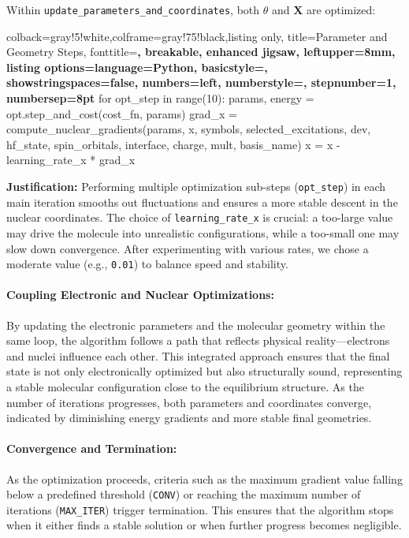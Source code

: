 Within \texttt{update\_parameters\_and\_coordinates}, both \(\theta\) and \(\mathbf{X}\) are optimized:
\begin{tcblisting}{colback=gray!5!white,colframe=gray!75!black,listing only,
    title=Parameter and Geometry Steps, fonttitle=\bfseries, breakable, enhanced jigsaw, leftupper=8mm,
    listing options={language=Python, basicstyle=\ttfamily\small,
    showstringspaces=false, numbers=left, numberstyle=\footnotesize, stepnumber=1, numbersep=8pt}}
for opt_step in range(10):
    params, energy = opt.step_and_cost(cost_fn, params)
    grad_x = compute_nuclear_gradients(params, x, symbols, selected_excitations, 
                                       dev, hf_state, spin_orbitals, interface, charge, mult, basis_name)
    x = x - learning_rate_x * grad_x
\end{tcblisting}

\textbf{Justification:}  
Performing multiple optimization sub-steps (\texttt{opt\_step}) in each main iteration smooths out fluctuations and ensures a more stable descent in the nuclear coordinates. The choice of \texttt{learning\_rate\_x} is crucial: a too-large value may drive the molecule into unrealistic configurations, while a too-small one may slow down convergence. After experimenting with various rates, we chose a moderate value (e.g., \texttt{0.01}) to balance speed and stability.

\paragraph{Coupling Electronic and Nuclear Optimizations:}  
By updating the electronic parameters and the molecular geometry within the same loop, the algorithm follows a path that reflects physical reality—electrons and nuclei influence each other. This integrated approach ensures that the final state is not only electronically optimized but also structurally sound, representing a stable molecular configuration close to the equilibrium structure. As the number of iterations progresses, both parameters and coordinates converge, indicated by diminishing energy gradients and more stable final geometries.

\paragraph{Convergence and Termination:}  
As the optimization proceeds, criteria such as the maximum gradient value falling below a predefined threshold (\texttt{CONV}) or reaching the maximum number of iterations (\texttt{MAX\_ITER}) trigger termination. This ensures that the algorithm stops when it either finds a stable solution or when further progress becomes negligible.


